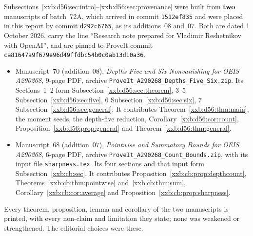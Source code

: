 \documentclass[11pt,a4paper]{article}
\numberwithin{equation}{section}
\theoremstyle{definition}
\theoremstyle{remark}
\theoremstyle{plain}
\begin{document}
Subsections~\ref{xxb:d56:sec:intro}--\ref{xxb:d56:sec:provenance} were built
from \textbf{two} manuscripts of batch~72A, which arrived in commit
\texttt{1512ef835} and were placed in this report by commit
\texttt{d292c6765}, as its additions~08 and~07.  Both are dated 1 October 2026,
carry the line ``Research note prepared for Vladimir Reshetnikov with OpenAI'',
and are pinned to ProveIt commit
\texttt{ca81647a9f679e96\allowbreak d49ffdbc54b0c0ab\allowbreak 13d10a36}.
\begin{itemize}[leftmargin=1.4em,itemsep=1pt]
\item Manuscript~70 (addition~08), \emph{Depths Five and Six Nonvanishing for
 OEIS A290268}, 9-page PDF, archive
 \texttt{ProveIt\_\allowbreak A290268\_\allowbreak Depths\_\allowbreak Five\_\allowbreak Six.zip}.
 Its Sections~1--2 form Subsection~\ref{xxb:d56:sec:theorem}, 3--5
 Subsection~\ref{xxb:d56:sec:five}, 6 Subsection~\ref{xxb:d56:sec:six}, 7
 Subsection~\ref{xxb:d56:sec:general}.  It contributes
 Theorem~\ref{xxb:d56:thm:main}, the moment seeds, the depth-five reduction,
 Corollary~\ref{xxb:d56:cor:count}, Proposition~\ref{xxb:d56:prop:general} and
 Theorem~\ref{xxb:d56:thm:general}.
\item Manuscript~68 (addition~07), \emph{Pointwise and Summatory Bounds for
 OEIS A290268}, 6-page PDF, archive
 \texttt{ProveIt\_\allowbreak A290268\_\allowbreak Count\_\allowbreak Bounds.zip},
 with its input file \texttt{sharpness.tex}.  Its four sections and that input
 form Subsection~\ref{xxb:cb:sec}.  It contributes
 Proposition~\ref{xxb:cb:prop:depthcount}, Theorems~\ref{xxb:cb:thm:pointwise}
 and~\ref{xxb:cb:thm:sum}, Corollary~\ref{xxb:cb:cor:average} and
 Proposition~\ref{xxb:cb:prop:sharpness}.
\end{itemize}
Every theorem, proposition, lemma and corollary of the two manuscripts is
printed, with every non-claim and limitation they state; none was weakened or
strengthened.  The editorial choices were these.
\end{document}
